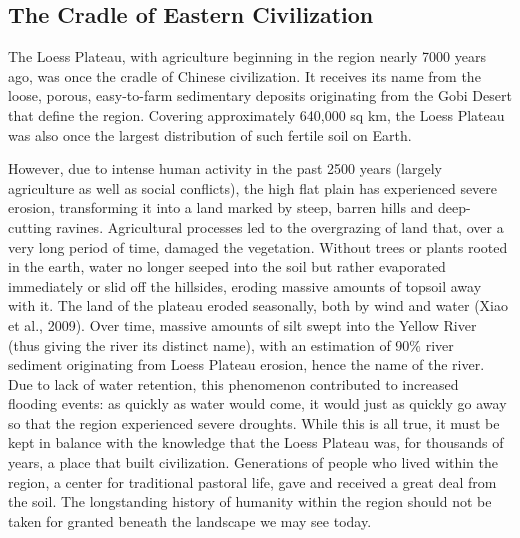 \documentclass{book}\usepackage{knitr}
\begin{document}
\subsection{The Cradle of Eastern Civilization}

The Loess Plateau, with agriculture beginning in the region nearly 7000 years ago, was once the cradle of Chinese civilization. It receives its name from the loose, porous, easy-to-farm sedimentary deposits originating from the Gobi Desert that define the region. Covering approximately 640,000 sq km, the Loess Plateau was also once the largest distribution of such fertile soil on Earth.

However, due to intense human activity in the past 2500 years (largely agriculture as well as social conflicts), the high flat plain has experienced severe erosion, transforming it into a land marked by steep, barren hills and deep-cutting ravines. Agricultural processes led to the overgrazing of land that, over a very long period of time, damaged the vegetation. Without trees or plants rooted in the earth, water no longer seeped into the soil but rather evaporated immediately or slid off the hillsides, eroding massive amounts of topsoil away with it. The land of the plateau eroded seasonally, both by wind and water (Xiao et al., 2009). Over time, massive amounts of silt swept into the Yellow River (thus giving the river its distinct name), with an estimation of 90\% river sediment originating from Loess Plateau erosion, hence the name of the river. Due to lack of water retention, this phenomenon contributed to increased flooding events: as quickly as water would come, it would just as quickly go away so that the region experienced severe droughts. While this is all true, it must be kept in balance with the knowledge that the Loess Plateau was, for thousands of years, a place that built civilization. Generations of people who lived within the region, a center for traditional pastoral life, gave and received a great deal from the soil. The longstanding history of humanity within the region should not be taken for granted beneath the landscape we may see today.
\end{document}
